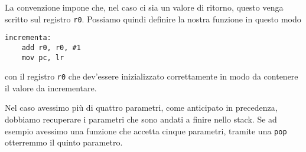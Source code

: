 La convenzione impone che, nel caso ci sia un valore di ritorno, questo venga scritto sul registro
\verb|r0|. Possiamo quindi definire la nostra funzione in questo modo
\begin{verbatim}
incrementa:
	add r0, r0, #1
	mov pc, lr
\end{verbatim}
con il registro \verb|r0| che dev'essere inizializzato correttamente in modo da contenere il valore
da incrementare.

Nel caso avessimo più di quattro parametri, come anticipato in precedenza, dobbiamo recuperare i
parametri che sono andati a finire nello stack. Se ad esempio avessimo una funzione che accetta
cinque parametri, tramite una \verb|pop| otterremmo il quinto parametro.